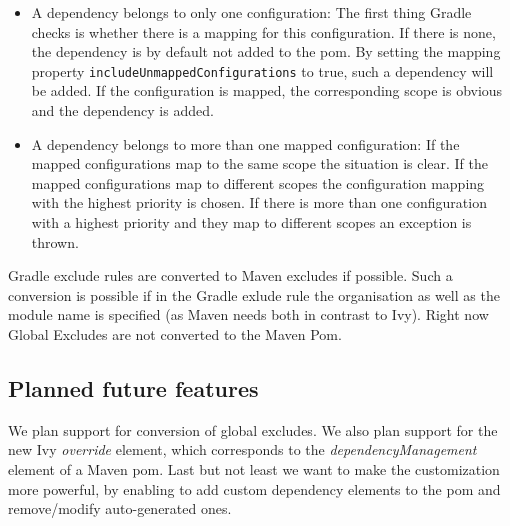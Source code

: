 \begin{itemize}
	\item A dependency belongs to only one configuration: The first thing Gradle checks is whether there is a mapping for this configuration. If there is none, the dependency is by default not added to the pom. By setting the  mapping property \texttt{includeUnmappedConfigurations} to true, such a dependency will be added. If the configuration is mapped, the corresponding scope is obvious and the dependency is added.
	\item A dependency belongs to more than one mapped configuration: If the mapped configurations map to the same scope the situation is clear. If the mapped configurations map to different scopes the configuration mapping with the highest priority is chosen. If there is more than one configuration with a highest priority and they map to different scopes an exception is thrown.
\end{itemize}
Gradle exclude rules are converted to Maven excludes if possible. Such a conversion is possible if in the Gradle exlude rule the organisation as well as the module name is specified (as Maven needs both in contrast to Ivy). Right now Global Excludes are not converted to the Maven Pom. 

\subsection{Planned future features} %
\label{sub:planned_future_features}
We plan support for conversion of global excludes. We also plan support for the new Ivy \emph{override} element, which corresponds to the \emph{dependencyManagement} element of a Maven pom. Last but not least we want to make the customization more powerful, by enabling to add custom dependency elements to the pom and remove/modify auto-generated ones.
